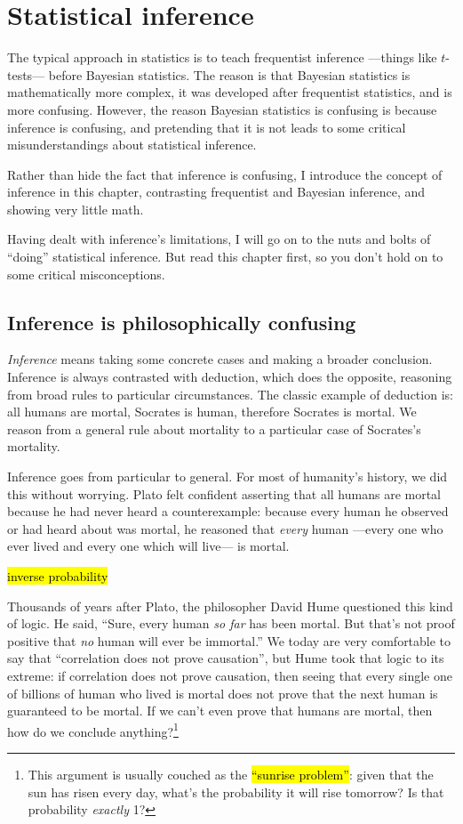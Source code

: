 
\chapter{Statistical inference}

The typical approach in statistics is to teach frequentist inference ---things like $t$-tests--- before Bayesian statistics. The reason is that Bayesian statistics is mathematically more complex, it was developed after frequentist statistics, and is more confusing. However, the reason Bayesian statistics is confusing is because inference is confusing, and pretending that it is not leads to some critical misunderstandings about statistical inference.

Rather than hide the fact that inference is confusing, I introduce the concept of inference in this chapter, contrasting frequentist and Bayesian inference, and showing very little math.

Having dealt with inference's limitations, I will go on to the nuts and bolts of ``doing'' statistical inference. But read this chapter first, so you don't hold on to some critical misconceptions.

\section{Inference is philosophically confusing}

\emph{Inference} means taking some concrete cases and making a broader
conclusion. Inference is always contrasted with deduction, which does the
opposite, reasoning from broad rules to particular circumstances. The classic
example of deduction is: all humans are mortal, Socrates is human, therefore
Socrates is mortal. We reason from a general rule about mortality to
a particular case of Socrates's mortality.

Inference goes from particular to general. For most of humanity's history, we
did this without worrying. Plato felt confident asserting that all humans are
mortal because he had never heard a counterexample: because every human he
observed or had heard about was mortal, he reasoned that \emph{every} human ---every one who ever lived and every one which will live--- is mortal.

\hl{inverse probability}

Thousands of years after Plato, the philosopher David Hume questioned this kind of logic. He said, ``Sure, every human \emph{so far} has been mortal. But that's not proof positive that \emph{no} human will ever be immortal.'' We today are very comfortable to say that ``correlation does not prove causation'', but Hume took that logic to its extreme: if correlation does not prove causation, then seeing that every single one of billions of human who lived is mortal does not prove that the next human is guaranteed to be mortal. If we can't even prove that humans are mortal, then how do we conclude anything?\footnote{This argument is usually couched as the \hl{``sunrise problem''}: given that the sun has risen every day, what's the probability it will rise tomorrow? Is that probability \emph{exactly} 1?}

